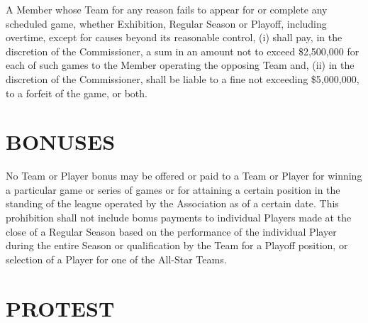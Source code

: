 \documentclass[]{book}
\theoremstyle{definition}
\theoremstyle{definition}
\theoremstyle{definition}
\theoremstyle{remark}
\begin{document}
A Member whose Team for any reason fails to appear for or complete any
scheduled game, whether Exhibition, Regular Season or Playoff, including
overtime, except for causes beyond its reasonable control, (i) shall
pay, in the discretion of the Commissioner, a sum in an amount not to
exceed \$2,500,000 for each of such games to the Member operating the
opposing Team and, (ii) in the discretion of the Commissioner, shall be
liable to a fine not exceeding \$5,000,000, to a forfeit of the game, or
both.

\section{BONUSES}\label{bonuses}

No Team or Player bonus may be offered or paid to a Team or Player for
winning a particular game or series of games or for attaining a certain
position in the standing of the league operated by the Association as of
a certain date. This prohibition shall not include bonus payments to
individual Players made at the close of a Regular Season based on the
performance of the individual Player during the entire Season or
qualification by the Team for a Playoff position, or selection of a
Player for one of the All-Star Teams.

\section{PROTEST}\label{protest}
\end{document}
